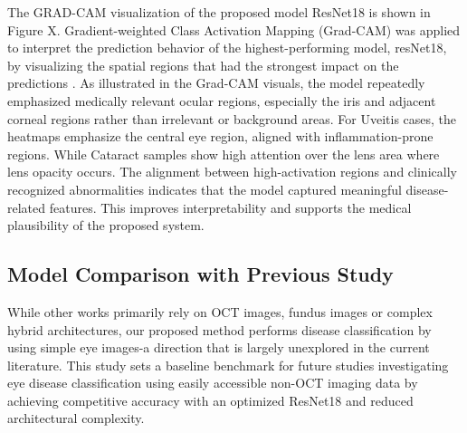 \documentclass[conference,9pt]{IEEEtran}
\begin{document}
   The GRAD-CAM visualization of the proposed model ResNet18 is shown in Figure X. Gradient-weighted Class Activation Mapping (Grad-CAM) was applied to interpret the prediction behavior of the highest-performing model, resNet18, by visualizing the spatial regions that had the strongest impact on the predictions \cite{gradcam}. As illustrated in the Grad-CAM visuals, the model repeatedly emphasized medically relevant ocular regions, especially the iris and adjacent corneal regions rather than irrelevant or background areas. For Uveitis cases, the heatmaps emphasize the central eye region, aligned with inflammation-prone regions. While Cataract samples show high attention over the lens area where lens opacity occurs. The alignment between high-activation regions and clinically recognized abnormalities indicates that the model captured meaningful disease-related features. This improves interpretability and supports the medical plausibility of the proposed system.

\subsection{\textbf{Model Comparison with Previous Study}}
\begin{table}[H]
\centering
\caption{Comparison with Previous Eye Disease Classification Studies}
\label{tab:oct_comparison}
\renewcommand{\arraystretch}{1.25}
\Large

\end{table}
While other works primarily rely on OCT images, fundus images or complex hybrid architectures, our proposed method performs disease classification by using simple eye images-a direction that is largely unexplored in the current literature. This study sets a baseline benchmark for future studies investigating eye disease classification using easily accessible non-OCT imaging data by achieving competitive accuracy with an optimized ResNet18 and reduced architectural complexity.
\end{document}
